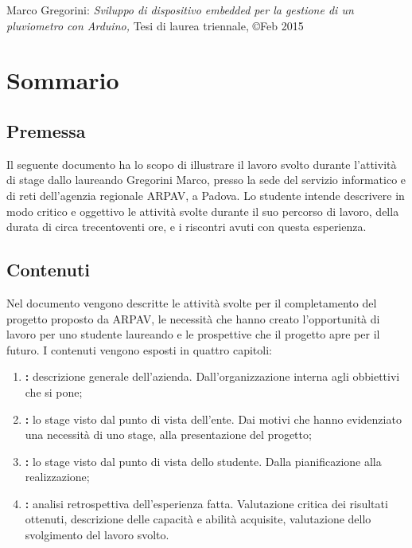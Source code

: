 \documentclass[11pt]{book}              %
\begin{document}
\newpage
\thispagestyle{empty}
\vspace*{\fill}

Marco Gregorini: \textit{Sviluppo di dispositivo embedded per la gestione di un pluviometro con Arduino,} Tesi di  laurea triennale, \copyright Feb 2015

\newpage




\chapter*{Sommario}

\section*{Premessa}


Il seguente documento ha lo scopo di illustrare il lavoro svolto durante l'attività di stage dallo laureando Gregorini Marco, presso la sede del servizio informatico e di reti dell'agenzia regionale ARPAV, a Padova. Lo studente intende descrivere in modo critico e oggettivo le attività svolte durante il suo percorso di lavoro, della durata di circa trecentoventi ore, e i riscontri avuti con questa esperienza.

\section*{Contenuti}

Nel documento vengono descritte le attività svolte per il completamento del progetto proposto da ARPAV, le necessità che hanno creato l'opportunità di lavoro per uno studente laureando e le prospettive che il progetto apre per il futuro.
I contenuti vengono esposti in quattro capitoli:

\begin{enumerate}
	\item \textbf{:} descrizione generale dell'azienda. Dall'organizzazione interna agli obbiettivi che si pone;
	\item \textbf{:} lo stage visto dal punto di vista dell'ente. Dai motivi che hanno evidenziato una necessità di uno stage, alla presentazione del progetto;
	\item \textbf{:} lo stage visto dal punto di vista dello studente. Dalla pianificazione alla realizzazione;
	\item \textbf{:} analisi retrospettiva dell'esperienza fatta. Valutazione critica dei risultati ottenuti, descrizione delle capacità e abilità acquisite, valutazione dello svolgimento del lavoro svolto.
\end{enumerate}
\end{document}

